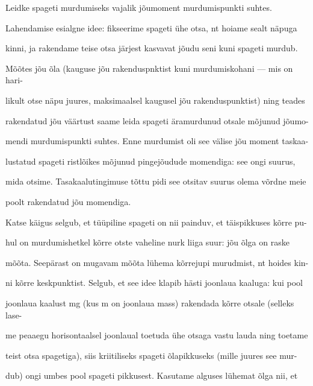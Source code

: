 
Leidke spageti murdumiseks vajalik jõumoment murdumispunkti suhtes.

\hint

\solu
Lahendamise esialgne idee: fikseerime spageti ühe otsa, nt hoiame sealt näpuga

kinni, ja rakendame teise otsa järjest kasvavat jõudu seni kuni spageti murdub.

Mõõtes jõu õla (kauguse jõu rakenduspnktist kuni murdumiskohani --- mis on hari-

likult otse näpu juures, maksimaalsel kaugusel jõu rakenduspunktist) ning teades

rakendatud jõu väärtust saame leida spageti äramurdunud otsale mõjunud jõumo-

mendi murdumispunkti suhtes. Enne murdumist oli see välise jõu moment taskaa-

lustatud spageti ristlõikes mõjunud pingejõudude momendiga: see ongi suurus,

mida otsime. Tasakaalutingimuse tõttu pidi see otsitav suurus olema võrdne meie

poolt rakendatud jõu momendiga.

Katse käigus selgub, et tüüpiline spageti on nii painduv, et täispikkuses kõrre pu-

hul on murdumishetkel kõrre otste vaheline nurk liiga suur: jõu õlga on raske

mõõta. Seepärast on mugavam mõõta lühema kõrrejupi murudmist, nt hoides kin-

ni kõrre keskpunktist. Selgub, et see idee klapib hästi joonlaua kaaluga: kui pool

joonlaua kaalust mg (kus m on joonlaua mass) rakendada kõrre otsale (selleks lase-

me peaaegu horisontaalsel joonlaual toetuda ühe otsaga vastu lauda ning toetame

teist otsa spagetiga), siis kriitiliseks spageti õlapikkuseks (mille juures see mur-

dub) ongi umbes pool spageti pikkusest. Kasutame alguses lühemat õlga nii, et

